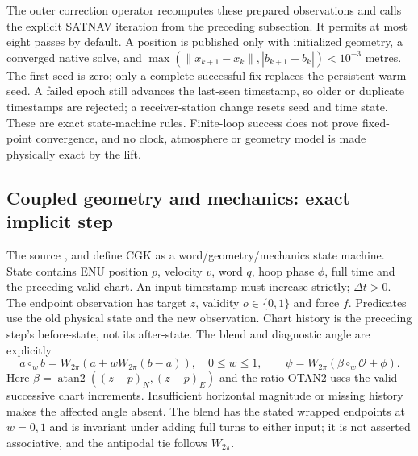 The outer correction operator recomputes these prepared observations and calls
the explicit SATNAV iteration from the preceding subsection. It permits at most
eight passes by default. A position is published only with initialized geometry,
a converged native solve, and
$\max(\|x_{k+1}-x_k\|,|b_{k+1}-b_k|)<10^{-3}$ metres. The first seed is zero;
only a complete successful fix replaces the persistent warm seed. A failed epoch
still advances the last-seen timestamp, so older or duplicate timestamps are
rejected; a receiver-station change resets seed and time state. These are exact
state-machine rules. Finite-loop success does not prove fixed-point convergence,
and no clock, atmosphere or geometry model is made physically exact by the lift.

\subsection{Coupled geometry and mechanics: exact implicit step}
\label{sec:lift-cgk}
The source ,  and
 define CGK as a word/geometry/mechanics state machine.
State contains ENU position $p$, velocity $v$, word $q$, hoop phase $\phi$,
full time and the preceding valid chart. An input timestamp must increase
strictly; $\Delta t>0$. The endpoint observation has target $z$, validity
$o\in\{0,1\}$ and force $f$. Predicates use the old physical state and the new
observation. Chart history is the preceding step's before-state, not its
after-state. The blend and diagnostic angle are explicitly
\begin{equation}
 a\mathbin{\circ_w}b=W_{2\pi}(a+wW_{2\pi}(b-a)),\quad 0\le w\le1,
 \qquad \psi=W_{2\pi}(\beta\mathbin{\circ_w}\mathcal O+\phi).
\end{equation}
Here $\beta=\operatorname{atan2}((z-p)_N,(z-p)_E)$ and the ratio OTAN2 uses
the valid successive chart increments. Insufficient horizontal magnitude or
missing history makes the affected angle absent. The blend has the stated
wrapped endpoints at $w=0,1$ and is invariant under adding full turns to either
input; it is not asserted associative, and the antipodal tie follows $W_{2\pi}$.

